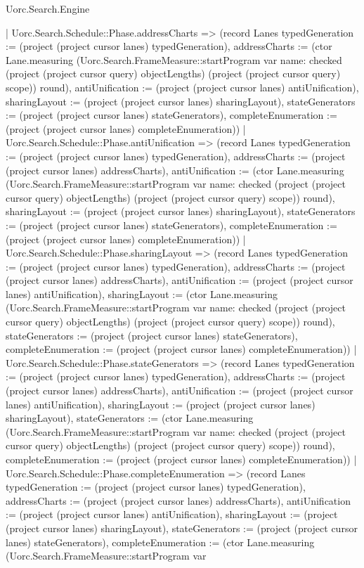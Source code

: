 \begin{lexlean}{Uorc.Search.Engine}
\begin{semanticmodule}
{{{{            | Uorc.Search.Schedule::Phase.addressCharts => (record Lanes {typedGeneration := (project (project cursor lanes) typedGeneration), addressCharts := (ctor Lane.measuring (Uorc.Search.FrameMeasure::startProgram var{
              name: checked
            } (project (project cursor query) objectLengths) (project (project cursor query) scope)) round), antiUnification := (project (project cursor lanes) antiUnification), sharingLayout := (project (project cursor lanes) sharingLayout), stateGenerators := (project (project cursor lanes) stateGenerators), completeEnumeration := (project (project cursor lanes) completeEnumeration)})
            | Uorc.Search.Schedule::Phase.antiUnification => (record Lanes {typedGeneration := (project (project cursor lanes) typedGeneration), addressCharts := (project (project cursor lanes) addressCharts), antiUnification := (ctor Lane.measuring (Uorc.Search.FrameMeasure::startProgram var{
              name: checked
            } (project (project cursor query) objectLengths) (project (project cursor query) scope)) round), sharingLayout := (project (project cursor lanes) sharingLayout), stateGenerators := (project (project cursor lanes) stateGenerators), completeEnumeration := (project (project cursor lanes) completeEnumeration)})
            | Uorc.Search.Schedule::Phase.sharingLayout => (record Lanes {typedGeneration := (project (project cursor lanes) typedGeneration), addressCharts := (project (project cursor lanes) addressCharts), antiUnification := (project (project cursor lanes) antiUnification), sharingLayout := (ctor Lane.measuring (Uorc.Search.FrameMeasure::startProgram var{
              name: checked
            } (project (project cursor query) objectLengths) (project (project cursor query) scope)) round), stateGenerators := (project (project cursor lanes) stateGenerators), completeEnumeration := (project (project cursor lanes) completeEnumeration)})
            | Uorc.Search.Schedule::Phase.stateGenerators => (record Lanes {typedGeneration := (project (project cursor lanes) typedGeneration), addressCharts := (project (project cursor lanes) addressCharts), antiUnification := (project (project cursor lanes) antiUnification), sharingLayout := (project (project cursor lanes) sharingLayout), stateGenerators := (ctor Lane.measuring (Uorc.Search.FrameMeasure::startProgram var{
              name: checked
            } (project (project cursor query) objectLengths) (project (project cursor query) scope)) round), completeEnumeration := (project (project cursor lanes) completeEnumeration)})
            | Uorc.Search.Schedule::Phase.completeEnumeration => (record Lanes {typedGeneration := (project (project cursor lanes) typedGeneration), addressCharts := (project (project cursor lanes) addressCharts), antiUnification := (project (project cursor lanes) antiUnification), sharingLayout := (project (project cursor lanes) sharingLayout), stateGenerators := (project (project cursor lanes) stateGenerators), completeEnumeration := (ctor Lane.measuring (Uorc.Search.FrameMeasure::startProgram var{
}}}}}}
\end{semanticmodule}
\end{lexlean}
